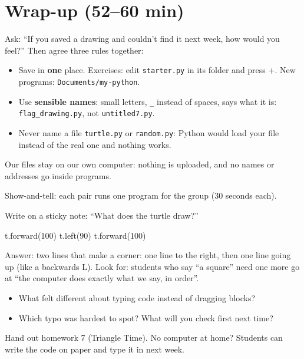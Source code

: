 \section{Wrap-up (52--60 min)}
\begin{safety}
Ask: \enquote{If you saved a drawing and couldn't find it next week, how would you feel?} Then agree three rules together:
\begin{itemize}[leftmargin=1.2em,itemsep=1pt]
  \item Save in \textbf{one} place. Exercises: edit \texttt{starter.py} in its folder and press +. New programs: \texttt{Documents/my-python}.
  \item Use \textbf{sensible names}: small letters, \texttt{\_} instead of spaces, says what it is: \texttt{flag\_drawing.py}, not \texttt{untitled7.py}.
  \item Never name a file \texttt{turtle.py} or \texttt{random.py}: Python would load your file instead of the real one and nothing works.
\end{itemize}
Our files stay on our own computer: nothing is uploaded, and no names or addresses go inside programs.
\end{safety}
Show-and-tell: each pair runs one program for the group (30 seconds each).
\begin{formativecheck}
Write on a sticky note: \enquote{What does the turtle draw?}
\begin{pycode}
t.forward(100)
t.left(90)
t.forward(100)
\end{pycode}
Answer: two lines that make a corner: one line to the right, then one line going up (like a backwards L). Look for: students who say \enquote{a square} need one more go at \enquote{the computer does exactly what we say, in order}.
\end{formativecheck}
\begin{reflection}
\begin{itemize}[leftmargin=1.2em,itemsep=1pt]
  \item What felt different about typing code instead of dragging blocks?
  \item Which typo was hardest to spot? What will you check first next time?
\end{itemize}
Hand out homework 7 (Triangle Time). No computer at home? Students can write the code on paper and type it in next week.
\end{reflection}

